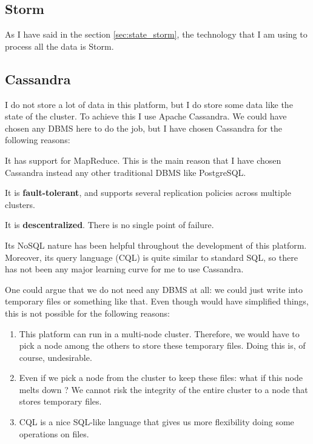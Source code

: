 \subsection{Storm}

As I have said in the section \ref{sec:state_storm}, the technology that I am
using to process all the data is Storm.

\subsection{Cassandra}
\label{sec:cassandra}

I do not store a lot of data in this platform, but I do store some data like
the state of the cluster. To achieve this I use Apache
Cassandra\cite{cassandra}. We could have chosen any \ac{DBMS} here to do the
job, but I have chosen Cassandra for the following reasons:

\mylist
  \item It has support for MapReduce. This is the main reason that I have
chosen Cassandra instead any other traditional \ac{DBMS} like PostgreSQL.
  \item It is {\bf fault-tolerant}, and supports several replication policies
across multiple clusters.
  \item It is {\bf descentralized}. There is no single point of failure.
  \item Its NoSQL nature has been helpful throughout the development of this
platform. Moreover, its query language (CQL) is quite similar to standard SQL,
so there has not been any major learning curve for me to use Cassandra.
\mylistend

One could argue that we do not need any \ac{DBMS} at all: we could just write
into temporary files or something like that. Even though would have simplified
things, this is not possible for the following reasons:

\begin{enumerate}
  \itemsep0em
  \item This platform can run in a multi-node cluster. Therefore, we would have
to pick a node among the others to store these temporary files. Doing this is,
of course, undesirable.
  \item Even if we pick a node from the cluster to keep these files: what if
this node melts down ? We cannot risk the integrity of the entire cluster to a
node that stores temporary files.
  \item CQL is a nice SQL-like language that gives us more flexibility doing
some operations on files.
\end{enumerate}

